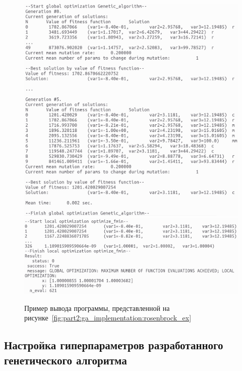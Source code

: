 \begin{figure}[ht]
    \centering
    \includegraphics[width=\linewidth]{images/part2/genetics_algorithm/ga_output.png}
    \includegraphics[width=\linewidth]{images/part2/genetics_algorithm/ls_output.png}
    \caption{Пример вывода программы, представленной на рисунке~\ref{fig:part2:ga_implementation:rosenbrock_ex}}
    \label{fig:part2:ga_implementation:rosenbrock_out}
\end{figure}

\FloatBarrier
\subsection{Настройка гиперпараметров разработанного генетического алгоритма}
\label{sec:part2:genetic_algorithm:hpo}

